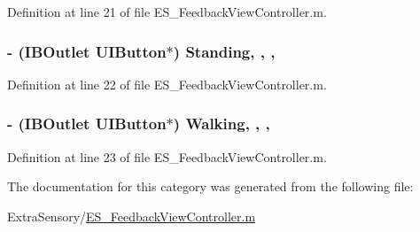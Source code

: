 Definition at line 21 of file E\+S\+\_\+\+Feedback\+View\+Controller.\+m.

\hypertarget{category_e_s___feedback_view_controller_07_08_a875cdbd13390c7638b76aabc44e8c3c8}{
\subsubsection[{Standing}]{\setlength{\rightskip}{0pt plus 5cm}-\/ (I\+B\+Outlet U\+I\+Button$\ast$) Standing\hspace{0.3cm}{\ttfamily [read]}, {\ttfamily [write]}, {\ttfamily [nonatomic]}, {\ttfamily [strong]}}}\label{category_e_s___feedback_view_controller_07_08_a875cdbd13390c7638b76aabc44e8c3c8}


Definition at line 22 of file E\+S\+\_\+\+Feedback\+View\+Controller.\+m.

\hypertarget{category_e_s___feedback_view_controller_07_08_a86cdae0b61f5860ae0177caf8463297b}{
\subsubsection[{Walking}]{\setlength{\rightskip}{0pt plus 5cm}-\/ (I\+B\+Outlet U\+I\+Button$\ast$) Walking\hspace{0.3cm}{\ttfamily [read]}, {\ttfamily [write]}, {\ttfamily [nonatomic]}, {\ttfamily [strong]}}}\label{category_e_s___feedback_view_controller_07_08_a86cdae0b61f5860ae0177caf8463297b}


Definition at line 23 of file E\+S\+\_\+\+Feedback\+View\+Controller.\+m.



The documentation for this category was generated from the following file\+:\begin{DoxyCompactItemize}
\item 
Extra\+Sensory/\hyperlink{_e_s___feedback_view_controller_8m}{E\+S\+\_\+\+Feedback\+View\+Controller.\+m}\end{DoxyCompactItemize}
